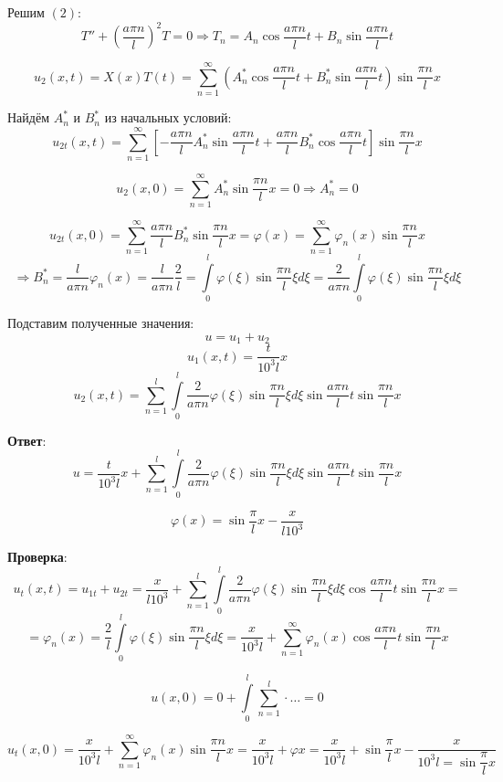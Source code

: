 Решим $(2)$:
$$ T'' + \left( \dfrac{a\pi n}{l} \right)^{2}T = 0 \Rightarrow T_{n} = A_{n} \cos{\dfrac{a\pi n}{l}}t + B_{n} \sin{\dfrac{a\pi n}{l}}t$$

$$ u_{2}(x, t) = X(x)T(t) = \sum_{n=1}^{\infty}  \left( A^{*}_{n} \cos{\dfrac{a\pi n}{l}}t + B^{*}_{n} \sin{\dfrac{a\pi n}{l}}t \right) \sin{\dfrac{\pi n}{l}}x$$

Найдём $A^{*}_{n}$ и $B^{*}_{n}$ из начальных условий:
$$ u_{2t}(x, t) = \sum_{n=1}^{\infty} \left[ -\dfrac{a\pi n}{l} A^{*}_{n} \sin{\dfrac{a\pi n}{l}}t + \dfrac{a\pi n}{l} B^{*}_{n} \cos{\dfrac{a\pi n}{l}}t \right] \sin{\dfrac{\pi n}{l}}x$$

$$ u_{2}(x, 0) = \sum_{n=1}^{\infty} A^{*}_{n} \sin{\dfrac{\pi n}{l}}x = 0 \Rightarrow A^{*}_{n} = 0 $$

$$ u_{2t}(x, 0) = \sum_{n=1}^{\infty} \dfrac{a\pi n}{l} B^{*}_{n} \sin{\dfrac{\pi n}{l}}x = \varphi(x) = \sum_{n=1}^{\infty} \varphi_{n}(x) \sin{\dfrac{\pi n}{l}}x$$
$$ \Rightarrow B^{*}_{n} = \dfrac{l}{a\pi n} \varphi_{n}(x) = \dfrac{l}{a\pi n} \dfrac{2}{l} = \int\limits_0^l \varphi(\xi) \sin{\dfrac{\pi n}{l}} \xi d\xi = \dfrac{2}{a\pi n} \int\limits_0^l \varphi(\xi) \sin{\dfrac{\pi n}{l}} \xi d\xi$$

Подставим полученные значения:
$$ u = u_{1} + u_{2}$$
$$ u_{1}(x, t) = \dfrac{t}{10^{3}l}x$$
$$ u_{2}(x, t) = \sum_{n=1}^{l} \int\limits_0^l \dfrac{2}{a\pi n} \varphi(\xi) \sin{\dfrac{\pi n}{l}} \xi d\xi \sin{\dfrac{a\pi n}{l}}t \sin{\dfrac{\pi n}{l}}x$$

\textbf{Ответ}:
$$ u = \dfrac{t}{10^{3}l}x + \sum_{n=1}^{l}  \int\limits_0^l \dfrac{2}{a\pi n} \varphi(\xi) \sin{\dfrac{\pi n}{l}} \xi d\xi \sin{\dfrac{a\pi n}{l}}t \sin{\dfrac{\pi n}{l}}x$$

$$ \varphi(x) = \sin{\dfrac{\pi}{l}}x - \dfrac{x}{l10^{3}}$$


\textbf{Проверка}:
$$ u_{t}(x, t) = u_{1t} + u_{2t} = \dfrac{x}{l10^{3}} + \sum_{n=1}^{l} \int\limits_0^l \dfrac{2}{a\pi n} \varphi(\xi) \sin{\dfrac{\pi n}{l}} \xi d\xi \cos{\dfrac{a\pi n}{l}}t \sin{\dfrac{\pi n}{l}}x = $$
$$ = \varphi_{n}(x) = \dfrac{2}{l} \int\limits_0^l \varphi(\xi) \sin{\dfrac{\pi n}{l}} \xi d\xi = \dfrac{x}{10^{3}l} + \sum_{n=1}^{\infty} \varphi_{n}(x) \cos{\dfrac{a\pi n}{l}}t \sin{\dfrac{\pi n}{l}}x$$


$$ u(x, 0) = 0 + \int\limits_0^l \sum_{n=1}^{l} \cdot \ldots = 0$$

$$ u_{t}(x, 0) = \dfrac{x}{10^{3}l} + \sum_{n=1}^{\infty} \varphi_{n}(x) \sin{\dfrac{\pi n}{l}}x = \dfrac{x}{10^{3}l} + \varphi x = \dfrac{x}{10^{3}l} + \sin{\dfrac{\pi}{l}}x - \dfrac{x}{10^{3}l = \sin{\dfrac{\pi}{l}}x}$$

